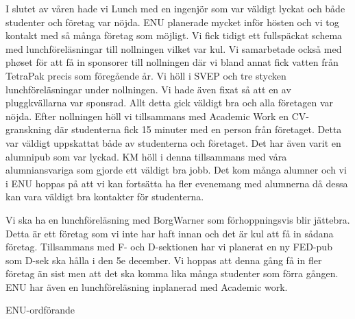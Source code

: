 \documentclass[../_main/handlingar.tex]{subfiles}
\begin{document}
I slutet av våren hade vi Lunch med en ingenjör som var väldigt lyckat och både studenter och företag var nöjda. ENU planerade mycket inför hösten och vi tog kontakt med så många företag som möjligt. Vi fick tidigt ett fullspäckat schema med lunchföreläsningar till nollningen vilket var kul. Vi samarbetade också med phøset för att få in sponsorer till nollningen där vi bland annat fick vatten från TetraPak precis som föregående år.
Vi höll i SVEP och tre stycken lunchföreläsningar under nollningen. Vi hade även fixat så att en av pluggkvällarna var sponsrad. Allt detta gick väldigt bra och alla företagen var nöjda.
Efter nollningen höll vi tillsammans med Academic Work en CV-granskning där studenterna fick 15 minuter med en person från företaget. Detta var väldigt uppskattat både av studenterna och företaget.
Det har även varit en alumnipub som var lyckad. KM höll i denna tillsammans med våra alumniansvariga som gjorde ett väldigt bra jobb. Det kom många alumner och vi i ENU hoppas på att vi kan fortsätta ha fler evenemang med alumnerna då dessa kan vara väldigt bra kontakter för studenterna.

Vi ska ha en lunchföreläsning med BorgWarner som förhoppningsvis blir jättebra. Detta är ett företag som vi inte har haft innan och det är kul att få in sådana företag.
Tillsammans med F- och D-sektionen har vi planerat en ny FED-pub som D-sek ska hålla i den 5e december. Vi hoppas att denna gång få in fler företag än sist men att det ska komma lika många studenter som förra gången.
ENU har även en lunchföreläsning inplanerad med Academic work.

\begin{signatures}{1}
	\mvh
	\signature{Isabella Hansen}{ENU-ordförande}
\end{signatures}
\end{document}
